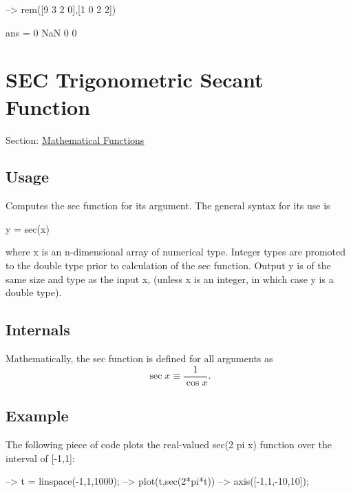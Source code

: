 \begin{DoxyVerbInclude}
--> rem([9 3 2 0],[1 0 2 2])

ans = 
         0 NaN         0         0 
\end{DoxyVerbInclude}
 \hypertarget{mathfunctions_sec}{}\section{S\-E\-C Trigonometric Secant Function}\label{mathfunctions_sec}
Section\-: \hyperlink{sec_mathfunctions}{Mathematical Functions} \hypertarget{vtkwidgets_vtkxyplotwidget_Usage}{}\subsection{Usage}\label{vtkwidgets_vtkxyplotwidget_Usage}
Computes the {\ttfamily sec} function for its argument. The general syntax for its use is \begin{DoxyVerb}  y = sec(x)
\end{DoxyVerb}
 where {\ttfamily x} is an {\ttfamily n}-\/dimensional array of numerical type. Integer types are promoted to the {\ttfamily double} type prior to calculation of the {\ttfamily sec} function. Output {\ttfamily y} is of the same size and type as the input {\ttfamily x}, (unless {\ttfamily x} is an integer, in which case {\ttfamily y} is a {\ttfamily double} type). \hypertarget{transforms_svd_Function}{}\subsection{Internals}\label{transforms_svd_Function}
Mathematically, the {\ttfamily sec} function is defined for all arguments as \[ \sec x \equiv \frac{1}{\cos x}. \] \hypertarget{variables_struct_Example}{}\subsection{Example}\label{variables_struct_Example}
The following piece of code plots the real-\/valued {\ttfamily sec(2 pi x)} function over the interval of {\ttfamily \mbox{[}-\/1,1\mbox{]}}\-:


\begin{DoxyVerbInclude}
--> t = linspace(-1,1,1000);
--> plot(t,sec(2*pi*t))
--> axis([-1,1,-10,10]);
\end{DoxyVerbInclude}


